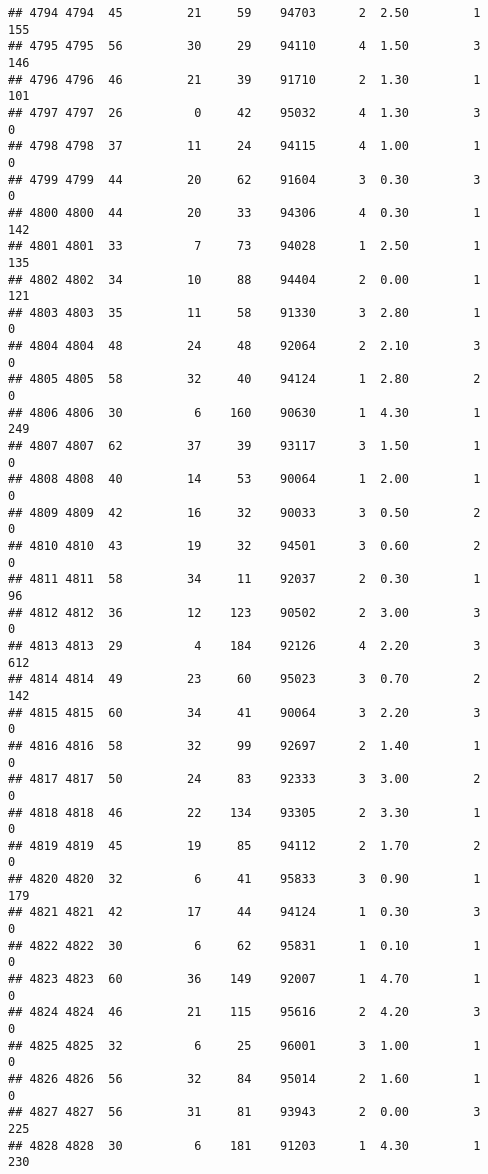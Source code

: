 \documentclass[
]{article}
\begin{document}
\begin{verbatim}
## 4794 4794  45         21     59    94703      2  2.50         1      155
## 4795 4795  56         30     29    94110      4  1.50         3      146
## 4796 4796  46         21     39    91710      2  1.30         1      101
## 4797 4797  26          0     42    95032      4  1.30         3        0
## 4798 4798  37         11     24    94115      4  1.00         1        0
## 4799 4799  44         20     62    91604      3  0.30         3        0
## 4800 4800  44         20     33    94306      4  0.30         1      142
## 4801 4801  33          7     73    94028      1  2.50         1      135
## 4802 4802  34         10     88    94404      2  0.00         1      121
## 4803 4803  35         11     58    91330      3  2.80         1        0
## 4804 4804  48         24     48    92064      2  2.10         3        0
## 4805 4805  58         32     40    94124      1  2.80         2        0
## 4806 4806  30          6    160    90630      1  4.30         1      249
## 4807 4807  62         37     39    93117      3  1.50         1        0
## 4808 4808  40         14     53    90064      1  2.00         1        0
## 4809 4809  42         16     32    90033      3  0.50         2        0
## 4810 4810  43         19     32    94501      3  0.60         2        0
## 4811 4811  58         34     11    92037      2  0.30         1       96
## 4812 4812  36         12    123    90502      2  3.00         3        0
## 4813 4813  29          4    184    92126      4  2.20         3      612
## 4814 4814  49         23     60    95023      3  0.70         2      142
## 4815 4815  60         34     41    90064      3  2.20         3        0
## 4816 4816  58         32     99    92697      2  1.40         1        0
## 4817 4817  50         24     83    92333      3  3.00         2        0
## 4818 4818  46         22    134    93305      2  3.30         1        0
## 4819 4819  45         19     85    94112      2  1.70         2        0
## 4820 4820  32          6     41    95833      3  0.90         1      179
## 4821 4821  42         17     44    94124      1  0.30         3        0
## 4822 4822  30          6     62    95831      1  0.10         1        0
## 4823 4823  60         36    149    92007      1  4.70         1        0
## 4824 4824  46         21    115    95616      2  4.20         3        0
## 4825 4825  32          6     25    96001      3  1.00         1        0
## 4826 4826  56         32     84    95014      2  1.60         1        0
## 4827 4827  56         31     81    93943      2  0.00         3      225
## 4828 4828  30          6    181    91203      1  4.30         1      230

\end{verbatim}
\end{document}

